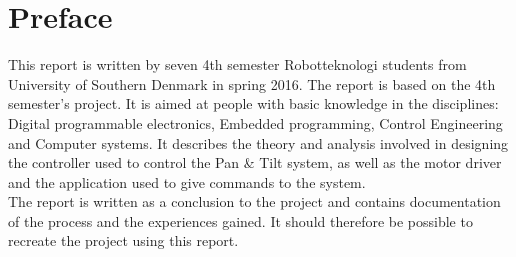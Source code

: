 \section*{Preface}

This report is written by seven 4th semester Robotteknologi students from University of Southern Denmark in spring 2016. The report is based on the 4th semester's project.
It is aimed at people with basic knowledge in the disciplines: Digital programmable electronics, Embedded programming, Control Engineering and Computer systems.
It describes the theory and analysis involved in designing the controller used to control the Pan \& Tilt system, as well as the motor driver and the application used to give commands to the system.\\
The report is written as a conclusion to the project and contains documentation of the process and the experiences gained. It should therefore be possible to recreate the project using this report.